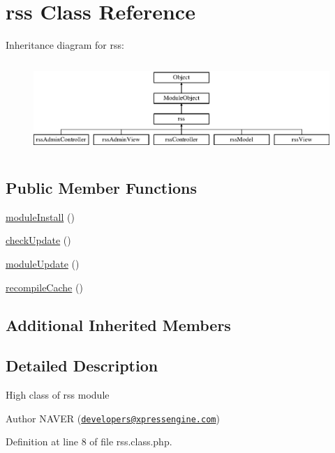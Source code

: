 \hypertarget{classrss}{}\section{rss Class Reference}
\label{classrss}
Inheritance diagram for rss\+:\begin{figure}[H]
\begin{center}
\leavevmode
\includegraphics[height=3.500000cm]{classrss}
\end{center}
\end{figure}
\subsection*{Public Member Functions}
\begin{DoxyCompactItemize}
\item 
\hyperlink{classrss_a6730f54dbfe8b8d31066f3658f02185b}{module\+Install} ()
\item 
\hyperlink{classrss_abea52ff499087ead7116c986080a685a}{check\+Update} ()
\item 
\hyperlink{classrss_a68d8a7c97f3afd095c5ed5c1a304e8e5}{module\+Update} ()
\item 
\hyperlink{classrss_a422550360916bdd9ced66d334f75f3a9}{recompile\+Cache} ()
\end{DoxyCompactItemize}
\subsection*{Additional Inherited Members}


\subsection{Detailed Description}
High class of rss module

\begin{DoxyAuthor}{Author}
N\+A\+V\+E\+R (\href{mailto:developers@xpressengine.com}{\tt developers@xpressengine.\+com}) 
\end{DoxyAuthor}


Definition at line 8 of file rss.\+class.\+php.



